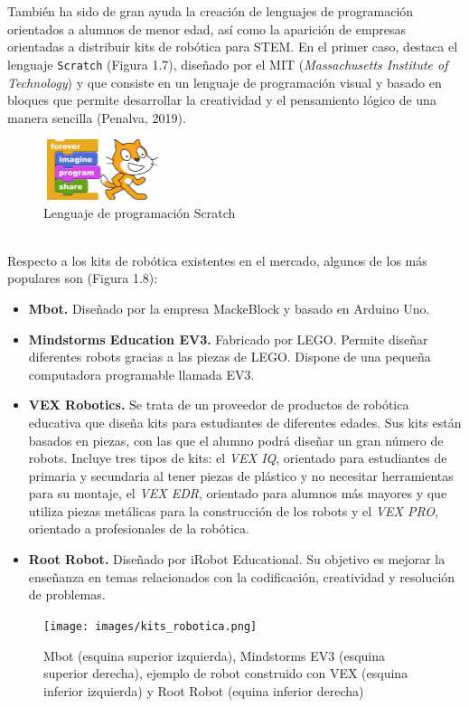 \documentclass{report}
\begin{document}
\\
\\
También ha sido de gran ayuda la creación de lenguajes de programación orientados a alumnos de menor edad, así como la aparición de empresas orientadas a distribuir kits de robótica para STEM. En el primer caso, destaca el lenguaje \texttt{Scratch} (Figura 1.7), diseñado por el MIT (\textit{Massachusetts Institute of Technology}) y que consiste en un lenguaje de programación visual y basado en bloques que permite desarrollar la creatividad y el pensamiento lógico de una manera sencilla (Penalva, 2019).
\\
\begin{figure}[h!]
  \centering
    \includegraphics[width=0.3\textwidth]{images/logo_scratch.png}
  \caption{Lenguaje de programación Scratch}
  \label{Lenguaje de programación Scratch}
\end{figure}
\\
Respecto a los kits de robótica existentes en el mercado, algunos de los más populares son (Figura 1.8):
\begin{itemize}
	\item \textbf{Mbot.} Diseñado por la empresa MackeBlock y basado en Arduino Uno.

	\item \textbf{Mindstorms Education EV3.} Fabricado por LEGO. Permite diseñar diferentes robots gracias a las piezas de LEGO. Dispone de una pequeña computadora programable llamada EV3.
			
	\item \textbf{VEX Robotics.} Se trata de un proveedor de productos de robótica educativa que diseña kits para estudiantes de diferentes edades. Sus kits están basados en piezas, con las que el alumno podrá diseñar un gran número de robots. Incluye tres tipos de kits: el \textit{VEX IQ}, orientado para estudiantes de primaria y secundaria al tener piezas de plástico y no necesitar herramientas para su montaje, el \textit{VEX EDR}, orientado para alumnos más mayores y que utiliza piezas metálicas para la construcción de los robots y el \textit{VEX PRO}, orientado a profesionales de la robótica.
	
	\item \textbf{Root Robot.} Diseñado por iRobot Educational. Su objetivo es mejorar la enseñanza en temas relacionados con la codificación, creatividad y resolución de problemas.
\end{itemize}
\begin{figure}[h!]
  \centering
    \texttt{[image: images/kits\_robotica.png]}
  \caption{Mbot (esquina superior izquierda), Mindstorms EV3 (esquina superior derecha), ejemplo de robot construido con VEX (esquina inferior izquierda) y Root Robot (equina inferior derecha)}
  \label{Mbot, Mindstorms EV3, ejemplo de robot construido con VEX  y Root Robot}
\end{figure}
\end{document}
